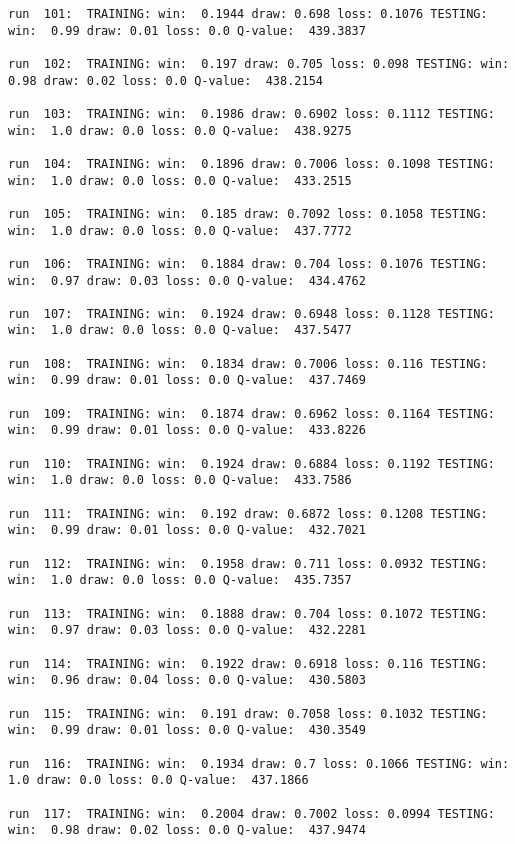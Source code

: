 \documentclass[11pt]{article}
\begin{document}
\begin{Verbatim}[commandchars=\\\{\}]
run  101:  TRAINING: win:  0.1944 draw: 0.698 loss: 0.1076 TESTING: win:  0.99 draw: 0.01 loss: 0.0 Q-value:  439.3837

run  102:  TRAINING: win:  0.197 draw: 0.705 loss: 0.098 TESTING: win:  0.98 draw: 0.02 loss: 0.0 Q-value:  438.2154

run  103:  TRAINING: win:  0.1986 draw: 0.6902 loss: 0.1112 TESTING: win:  1.0 draw: 0.0 loss: 0.0 Q-value:  438.9275

run  104:  TRAINING: win:  0.1896 draw: 0.7006 loss: 0.1098 TESTING: win:  1.0 draw: 0.0 loss: 0.0 Q-value:  433.2515

run  105:  TRAINING: win:  0.185 draw: 0.7092 loss: 0.1058 TESTING: win:  1.0 draw: 0.0 loss: 0.0 Q-value:  437.7772

run  106:  TRAINING: win:  0.1884 draw: 0.704 loss: 0.1076 TESTING: win:  0.97 draw: 0.03 loss: 0.0 Q-value:  434.4762

run  107:  TRAINING: win:  0.1924 draw: 0.6948 loss: 0.1128 TESTING: win:  1.0 draw: 0.0 loss: 0.0 Q-value:  437.5477

run  108:  TRAINING: win:  0.1834 draw: 0.7006 loss: 0.116 TESTING: win:  0.99 draw: 0.01 loss: 0.0 Q-value:  437.7469

run  109:  TRAINING: win:  0.1874 draw: 0.6962 loss: 0.1164 TESTING: win:  0.99 draw: 0.01 loss: 0.0 Q-value:  433.8226

run  110:  TRAINING: win:  0.1924 draw: 0.6884 loss: 0.1192 TESTING: win:  1.0 draw: 0.0 loss: 0.0 Q-value:  433.7586

run  111:  TRAINING: win:  0.192 draw: 0.6872 loss: 0.1208 TESTING: win:  0.99 draw: 0.01 loss: 0.0 Q-value:  432.7021

run  112:  TRAINING: win:  0.1958 draw: 0.711 loss: 0.0932 TESTING: win:  1.0 draw: 0.0 loss: 0.0 Q-value:  435.7357

run  113:  TRAINING: win:  0.1888 draw: 0.704 loss: 0.1072 TESTING: win:  0.97 draw: 0.03 loss: 0.0 Q-value:  432.2281

run  114:  TRAINING: win:  0.1922 draw: 0.6918 loss: 0.116 TESTING: win:  0.96 draw: 0.04 loss: 0.0 Q-value:  430.5803

run  115:  TRAINING: win:  0.191 draw: 0.7058 loss: 0.1032 TESTING: win:  0.99 draw: 0.01 loss: 0.0 Q-value:  430.3549

run  116:  TRAINING: win:  0.1934 draw: 0.7 loss: 0.1066 TESTING: win:  1.0 draw: 0.0 loss: 0.0 Q-value:  437.1866

run  117:  TRAINING: win:  0.2004 draw: 0.7002 loss: 0.0994 TESTING: win:  0.98 draw: 0.02 loss: 0.0 Q-value:  437.9474


\end{Verbatim}
\end{document}
